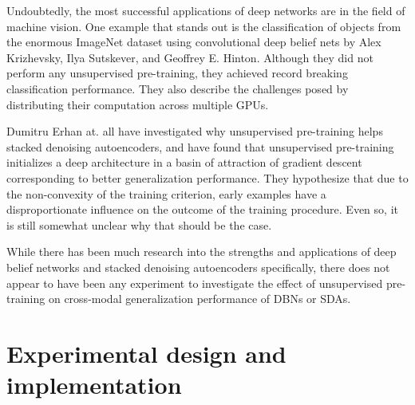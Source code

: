 \documentclass[12pt]{article}
\begin{document}
\begin{doublespacing}
Undoubtedly, the most successful applications of deep networks are in the field of machine vision. One example that stands out is the classification of objects from the enormous ImageNet dataset using convolutional deep belief nets by Alex Krizhevsky, Ilya Sutskever, and Geoffrey E. Hinton\cite{krizhevsky2012imagenet}. Although they did not perform any unsupervised pre-training, they achieved record breaking classification performance. They also describe the challenges posed by distributing their computation across multiple GPUs.

Dumitru Erhan at. all have investigated why unsupervised pre-training helps stacked denoising autoencoders, and have found that unsupervised pre-training initializes a deep architecture in a basin of attraction of gradient descent corresponding to better generalization performance. They hypothesize that due to the non-convexity of the training criterion, early examples have a disproportionate influence on the outcome of the training procedure. Even so, it is still somewhat unclear why that should be the case. \cite{erhan2010does}

While there has been much research into the strengths and applications of deep belief networks and stacked denoising autoencoders specifically, there does not appear to have been any experiment to investigate the effect of unsupervised pre-training on cross-modal generalization performance of DBNs or SDAs.

	
\section{Experimental design and implementation}

\end{doublespacing}
\end{document}
